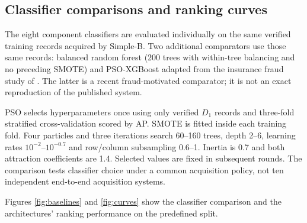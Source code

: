 \subsection{Classifier comparisons and ranking curves}\label{sec:comparators}
The eight component classifiers are evaluated individually on the same
verified training records acquired by Simple-B. Two additional comparators
use those same records: balanced random forest (200 trees with within-tree
balancing and no preceding SMOTE) and PSO-XGBoost adapted from the insurance
fraud study of \citet{Ding2025}. The latter is a recent fraud-motivated
comparator; it is not an exact reproduction of the published system.

PSO selects hyperparameters once using only verified $D_1$ records and
three-fold stratified cross-validation scored by AP. SMOTE is fitted inside
each training fold. Four particles and three iterations search 60--160 trees,
depth 2--6, learning rates $10^{-2}$--$10^{-0.7}$ and row/column subsampling
0.6--1. Inertia is 0.7 and both attraction coefficients are 1.4.
Selected values are fixed in subsequent rounds. The comparison tests
classifier choice under a common acquisition policy, not ten independent
end-to-end acquisition systems.


Figures \ref{fig:baselines} and \ref{fig:curves} show the classifier comparison
and the architectures' ranking performance on the predefined split.

